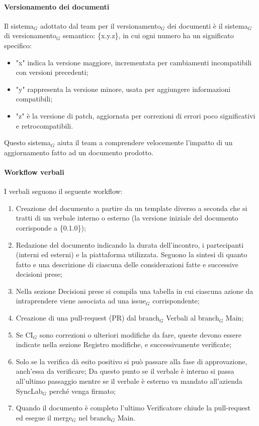 \documentclass[10pt]{article}
\begin{document}
\begin{justify}
        \paragraph{Versionamento dei documenti}
        Il sistema$_G$ adottato dal team per il versionamento$_G$ dei documenti è il sistema$_G$ di versionamento$_G$ semantico: \{x.y.z\}, in cui ogni numero ha un significato specifico:\\
        \begin{itemize}
            \item "x" indica la versione maggiore, incrementata per cambiamenti incompatibili con versioni precedenti;
            \item "y" rappresenta la versione minore, usata per aggiungere informazioni compatibili;
            \item "z" è la versione di patch, aggiornata per correzioni di errori poco significativi e retrocompatibili.
        \end{itemize}
        Questo sistema$_G$ aiuta il team a comprendere velocemente l'impatto di un aggiornamento fatto ad un documento prodotto.\\

        \paragraph{Workflow verbali}
        I verbali seguono il seguente workflow:
        \begin{enumerate}
            \item Creazione del documento a partire da un template diverso a seconda che si tratti di un verbale interno o esterno (la versione iniziale del documento corrisponde a \{0.1.0\});
            \item Redazione del documento indicando la durata dell'incontro, i partecipanti (interni ed esterni) e la piattaforma utilizzata. Seguono la sintesi di quanto fatto e una descrizione di ciascuna delle considerazioni fatte e successive decisioni prese;
            \item Nella sezione Decisioni prese si compila una
            tabella in cui ciascuna azione da intraprendere viene associata ad una issue$_G$ corrispondente;
            \item Creazione di una pull-request (PR) dal branch$_G$ Verbali al branch$_G$ Main;
            \item Se CI$_G$ sono correzioni o ulteriori modifiche da fare, queste devono essere indicate nella sezione Registro modifiche, e successivamente verificate;
            \item Solo se la verifica dà esito positivo si può passare alla fase di approvazione, anch'essa da verificare;
            Da questo punto se il verbale è interno si passa all'ultimo passaggio mentre se il verbale è esterno va mandato all'azienda SyncLab$_G$ perché venga firmato;
            \item Quando il documento è completo l'ultimo Verificatore
            chiude la pull-request ed esegue il merge$_G$ nel branch$_G$ Main.
        \end{enumerate}


\end{justify}
\end{document}
